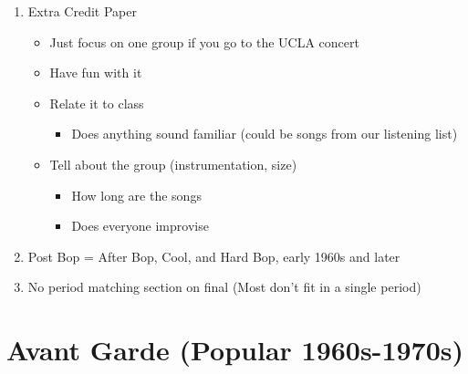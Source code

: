 \documentclass[]{article}
\date{}
\providecommand{\tightlist}{%
  \setlength{\itemsep}{0pt}\setlength{\parskip}{0pt}}
\begin{document}
\begin{enumerate}
\def\labelenumi{\arabic{enumi}.}
\tightlist
\item
  Extra Credit Paper

  \begin{itemize}
  \tightlist
  \item
    Just focus on one group if you go to the UCLA concert
  \item
    Have fun with it
  \item
    Relate it to class

    \begin{itemize}
    \tightlist
    \item
      Does anything sound familiar (could be songs from our listening
      list)
    \end{itemize}
  \item
    Tell about the group (instrumentation, size)

    \begin{itemize}
    \tightlist
    \item
      How long are the songs
    \item
      Does everyone improvise
    \end{itemize}
  \end{itemize}
\item
  Post Bop = After Bop, Cool, and Hard Bop, early 1960s and later
\item
  No period matching section on final (Most don't fit in a single
  period)
\end{enumerate}

\section{Avant Garde (Popular
1960s-1970s)}\label{avant-garde-popular-1960s-1970s}
\end{document}
